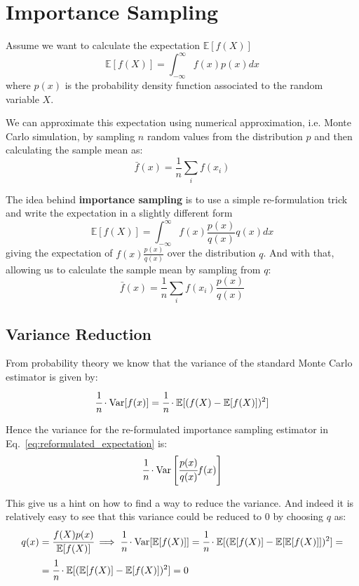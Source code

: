 \documentclass[12pt,a4paper]{article}
\begin{document}
\clearpage
\section{Importance Sampling}
Assume we want to calculate the expectation $\mathbb{E}[f(X)]$
\begin{equation}
\mathbb{E}[f(X)] = \int_{-\infty}^\infty f(x)p(x)dx
\end{equation}
where $p(x)$ is the probability density function associated to the random variable $X$.

We can approximate this expectation using numerical approximation, i.e. Monte Carlo simulation, by sampling $n$ random values from the distribution $p$ and then calculating the sample mean as:
\begin{equation}
\bar{f}(x) = \frac{1}{n}\sum_i f(x_i)
\end{equation}

The idea behind \textbf{importance sampling} is to use a simple re-formulation trick and write the expectation in a slightly different form
\begin{equation}
\mathbb{E}[f(X)] = \int_{-\infty}^\infty f(x)\frac{p(x)}{q(x)}q(x)dx
\end{equation}
giving the expectation of $f(x)\frac{p(x)}{q(x)}$ over the distribution $q$. And with that, allowing us to calculate the sample mean by sampling from $q$:
\begin{equation}
\bar{f}(x) = \frac{1}{n}\sum_i f(x_i)\frac{p(x)}{q(x)}
\label{eq:reformulated_expectation}
\end{equation}

\subsection{Variance Reduction}
From probability theory we know that the variance of the standard Monte Carlo estimator is given by:
\begin{equation}
\cfrac{1}{n}\cdot\text{Var}[f(x)] = \cfrac{1}{n}\cdot\mathbb{E}[(f(X)-\mathbb{E}[f(X)])^2]
\end{equation}

Hence the variance for the re-formulated importance sampling estimator in Eq.~\ref{eq:reformulated_expectation} is:
\begin{equation}
\cfrac{1}{n}\cdot\text{Var}\left[\cfrac{p(x)}{q(x)}f(x)\right]
\end{equation}

This give us a hint on how to find a way to reduce the variance. And indeed it is relatively easy to see that this variance could be reduced to 0 by choosing $q$ as:
\begin{equation}
\begin{aligned}
q(x)&=\cfrac{f(X)p(x)}{\mathbb{E}[f(X)]} \implies \cfrac{1}{n}\cdot\text{Var}[\mathbb{E}[f(X)]] = \cfrac{1}{n}\cdot\mathbb{E}[(\mathbb{E}[f(X)]-\mathbb{E}[\mathbb{E}[f(X)]])^2]=\\
&=\cfrac{1}{n}\cdot\mathbb{E}[(\mathbb{E}[f(X)]-\mathbb{E}[f(X)])^2] = 0
\end{aligned}
\end{equation}
\end{document}
